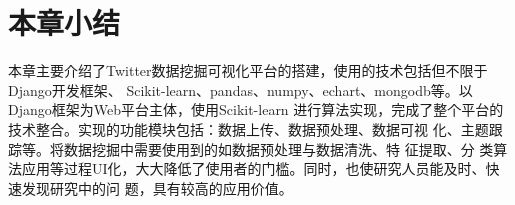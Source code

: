 
\section{本章小结}
本章主要介绍了Twitter数据挖掘可视化平台的搭建，使用的技术包括但不限于Django开发框架、
Scikit-learn、pandas、numpy、echart、mongodb等。以Django框架为Web平台主体，使用Scikit-learn
进行算法实现，完成了整个平台的技术整合。实现的功能模块包括：数据上传、数据预处理、数据可视
化、主题跟踪等。将数据挖掘中需要使用到的如数据预处理与数据清洗、特
征提取、分
类算法应用等过程UI化，大大降低了使用者的门槛。同时，也使研究人员能及时、快速发现研究中的问
题，具有较高的应用价值。


